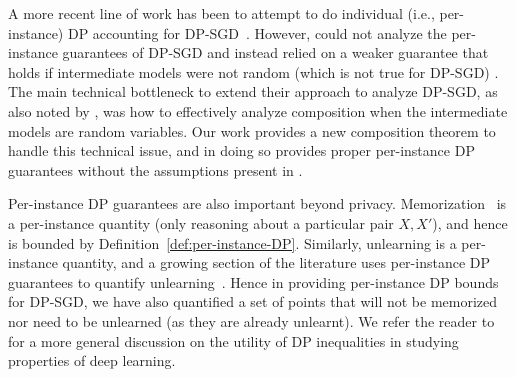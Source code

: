 A more recent line of work has been to attempt to do individual (i.e., per-instance) DP accounting for DP-SGD~\citep{yu2022individual}. However, \citet{yu2022individual} could not analyze the per-instance guarantees of DP-SGD and instead relied on a weaker guarantee that holds if intermediate models were not random (which is not true for DP-SGD)%
. The main technical bottleneck to extend their approach to analyze DP-SGD, as also noted by \citet{yu2022individual}, was how to effectively analyze composition when the intermediate models are random variables. Our work provides a new composition theorem to handle this technical issue, and in doing so provides proper per-instance DP guarantees without the assumptions present in \citet{yu2022individual}.


Per-instance DP guarantees are also important beyond privacy. Memorization~\citep{feldman2020does} is a per-instance quantity (only reasoning about a particular pair $X,X'$), and hence is bounded by Definition~\ref{def:per-instance-DP}. Similarly, unlearning is a per-instance quantity, and a growing section of the literature uses per-instance DP guarantees to quantify unlearning~\citep{guo2019certified}. Hence in providing per-instance DP bounds for DP-SGD, we have also quantified a set of points that will not be memorized nor need to be unlearned (as they are already unlearnt). We refer the reader to \citet{kulynych2022you} for a more general discussion on the utility of DP inequalities in studying properties of deep learning.


